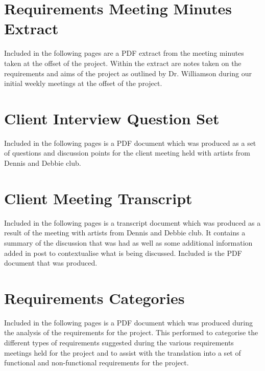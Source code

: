 \documentclass{l4proj}
\begin{document}
\begin{appendices}

\chapter{Requirements Meeting Minutes Extract}
\label{sec:appendmreqmeetmins}
Included in the following pages are a PDF extract from the meeting minutes taken at the offset of the project. Within the extract are notes taken on the requirements and aims of the project as outlined by Dr. Williamson during our initial weekly meetings at the offset of the project. 



\chapter{Client Interview Question Set}
\label{sec:appendclientinterviewquestions}
Included in the following pages is a PDF document which was produced as a set of questions and discussion points for the client meeting held with artists from Dennis and Debbie club.



\chapter{Client Meeting Transcript}
\label{sec:appenddndtranscript}
Included in the following pages is a transcript document which was produced as a result of the meeting with artists from Dennis and Debbie club. It contains a summary of the discussion that was had as well as some additional information added in post to contextualise what is being discussed. Included is the PDF document that was produced.



\chapter{Requirements Categories}
\label{sec:appendreqcat}
Included in the following pages is a PDF document which was produced during the analysis of the requirements for the project. This performed to categorise the different types of requirements suggested during the various requirements meetings held for the project and to assist with the translation into a set of functional and non-functional requirements for the project. 


\end{appendices}
\end{document}
